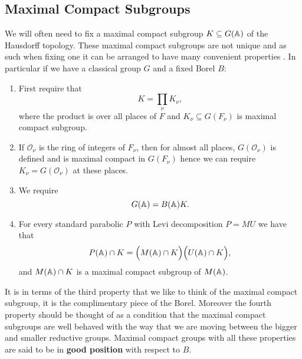     \subsection{Maximal Compact Subgroups}\label{max_compact_subgroup}
    We will often need to fix a maximal compact subgroup \(K\subseteq G(\A)\) of the Hausdorff topology. These maximal compact subgroups are not unique and as such when fixing one it can be arranged to have many convenient properties \cite[I.1.4]{moeglinSpectralDecompositionEisenstein1995}. In particular if we have a classical group \(G\) and a fixed Borel \(B\):
    \begin{enumerate}
        \item First require that 
        \[K = \prod_\nu K_\nu,\]
        where the product is over all places of \(F\) and \(K_\nu\subseteq G(F_\nu)\) is maximal compact subgroup.
        \item If \(\mathcal{O}_\nu\) is the ring of integers of \(F_\nu\), then for almost all places, \(G(\mathcal{O}_{\nu})\) is defined and is maximal compact in \(G(F_\nu)\) hence we can require \(K_\nu = G(\mathcal{O}_{\nu})\) at these places. 
        \item We require 
        \[G(\A) = B(\A)K.\]
        \item For every standard parabolic \(P \) with Levi decomposition \(P=MU\) we have that 
        \[P(\A)\cap K = \Bigl( M(\A)\cap K \Bigr) \Bigl( U(\A)\cap K \Bigr),\]
        and \(M(\A)\cap K\) is a maximal compact subgroup of \(M(\A)\).
    \end{enumerate}
     It is in terms of the third property that we like to think of the maximal compact subgroup, it is the complimentary piece of the Borel. Moreover the fourth property should be thought of as a condition that the maximal compact subgroups are well behaved with the way that we are moving between the bigger and smaller reductive groups.
    Maximal compact groups with all these properties are said to be in \textbf{good position} with respect to \(B\).

